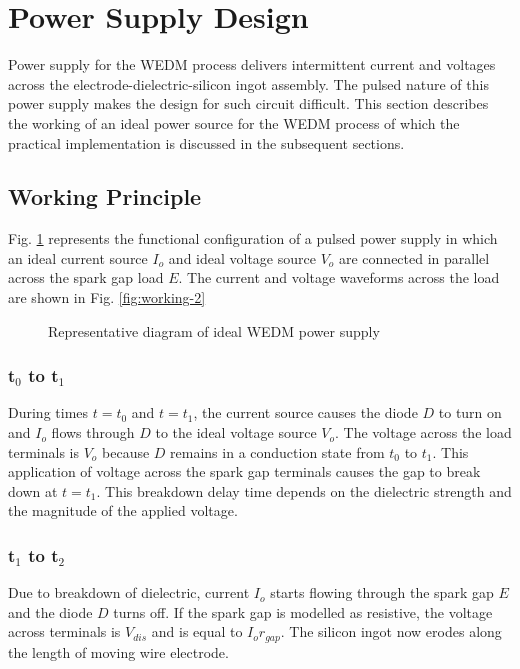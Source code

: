 \documentclass[a4paper]{IEEEtran}
\begin{document}
\section{Power Supply Design}
	Power supply for the WEDM process delivers intermittent current and voltages across the electrode-dielectric-silicon ingot assembly. The pulsed nature of this power supply makes the design for such circuit difficult. This section describes the working of an ideal power source for the WEDM process of which the practical implementation is discussed in the subsequent sections.

\subsection{Working Principle}
	Fig. \ref{fig:working-1} represents the functional configuration of a pulsed power supply in which an ideal current source $I_o$ and ideal voltage source $V_o$ are connected in parallel across the spark gap load $E$. The current and voltage waveforms across the load are shown in Fig. \ref{fig:working-2}

	\begin{figure}
		\centering
		
		\caption{Representative diagram of ideal WEDM power supply}
		\label{fig:working-1}
	\end{figure}

\subsubsection{\textbf{t$_0$ to t$_1$}}
	During times $t=t_0$ and $t=t_1$, the current source causes the diode $D$ to turn on and $I_o$ flows through $D$ to the ideal voltage source $V_o$. The voltage across the load terminals is $V_o$ because $D$ remains in a conduction state from $t_0$ to $t_1$. This application of voltage across the spark gap terminals causes the gap to break down at $t=t_1$. This breakdown delay time depends on the dielectric strength and the magnitude of the applied voltage.

\subsubsection{\textbf{t$_1$ to t$_2$}}
	Due to breakdown of dielectric, current $I_o$ starts flowing through the spark gap $E$ and the diode $D$ turns off. If the spark gap is modelled as resistive, the voltage across terminals is $V_{dis}$ and is equal to $I_or_{gap}$. The silicon ingot now erodes along the length of moving wire electrode.
\end{document}
